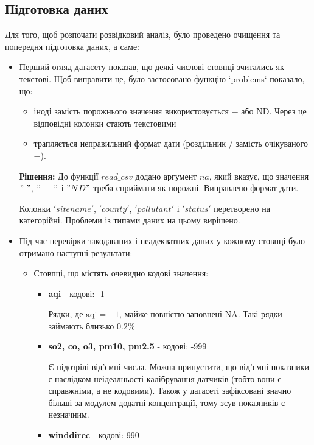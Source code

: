 \documentclass{article}
\begin{document}
\subsection{Підготовка даних}
Для того, щоб розпочати розвідковий аналіз, було проведено очищення та попередня підготовка даних, а саме: 
\begin{itemize}
    \item Перший огляд датасету показав, що деякі числові стовпці зчитались як текстові. 
    Щоб виправити це, було застосовано функцію `problems` показало, що:
        \begin{itemize}
            \item іноді замість порожнього значення використовується $-$ або ND. Через це відповідні колонки стають текстовими
            \item трапляється неправильний формат дати (роздільник $/$ замість очікуваного $-$).
        \end{itemize}
   \textbf{Рішення:} До функції $read\_csv$ додано аргумент $na$, який вказує, що значення $" \ "$, $"\ -"$ і $"ND"$ треба сприймати як порожні. Виправлено формат дати.
   
   Колонки $'sitename'$, $'county'$, $'pollutant'$ і $'status'$ перетворено на категорійні. Проблеми із типами даних на цьому вирішено.
   
   \newpage
   
    \item Під час перевірки закодаваних і неадекватних даних у кожному стовпці було отримано наступні результати: 
         \begin{itemize}
             \item Стовпці, що містять очевидно кодові значення:
             \begin{itemize}
                \item \textbf{aqi} - кодові: -1
                
                Рядки, де $\text{aqi} = -1$, майже повністю заповнені NA. Такі рядки займають близько $0.2\%$
                \item \textbf{so2, co, o3, pm10, pm2.5}  - кодові: -999
                
                Є підозрілі від'ємні числа. Можна припустити, що від'ємні показники є наслідком неідеалньості калібрування датчиків (тобто вони є справжніми, а не кодовими). Також у датасеті зафіксовані значно більші за модулем додатні концентрації, тому зсув показників є незначним.
                \item \textbf{winddirec} - кодові: 990
             \end{itemize}
             

\end{itemize}
\end{itemize}
\end{document}
